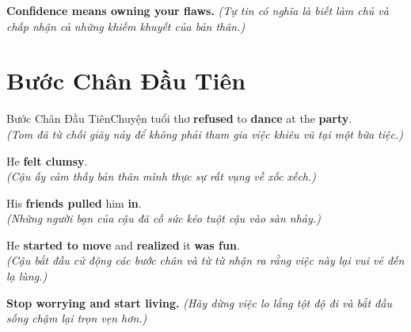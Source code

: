 \begin{baihoc}
  \textbf{Confidence means owning your flaws.} \textit{(Tự tin có nghĩa là biết làm chủ và chấp nhận cả những khiếm khuyết của bản thân.)}
\end{baihoc}

\vspace{0.8cm}

\ngayDay{}
\section{Bước Chân Đầu Tiên}
\begin{truyen}{Bước Chân Đầu Tiên}{Chuyện tuổi thơ}
 \textbf{refused} to \textbf{dance} at the \textbf{party}.\\
\textit{(Tom đã từ chối giãy nảy để không phải tham gia việc khiêu vũ tại một bữa tiệc.)}

He \textbf{felt clumsy}.\\
\textit{(Cậu ấy cảm thấy bản thân mình thực sự rất vụng về xốc xếch.)}

His \textbf{friends pulled} him \textbf{in}.\\
\textit{(Những người bạn của cậu đã cố sức kéo tuột cậu vào sàn nhảy.)}

He \textbf{started to move} and \textbf{realized} it \textbf{was fun}.\\
\textit{(Cậu bắt đầu cử động các bước chân và từ từ nhận ra rằng việc này lại vui vẻ đến lạ lùng.)}
\end{truyen}

\begin{baihoc}
  \textbf{Stop worrying and start living.} \textit{(Hãy dừng việc lo lắng tột độ đi và bắt đầu sống chậm lại trọn vẹn hơn.)}
\end{baihoc}

\vspace{0.8cm}

\ngayDay{}
